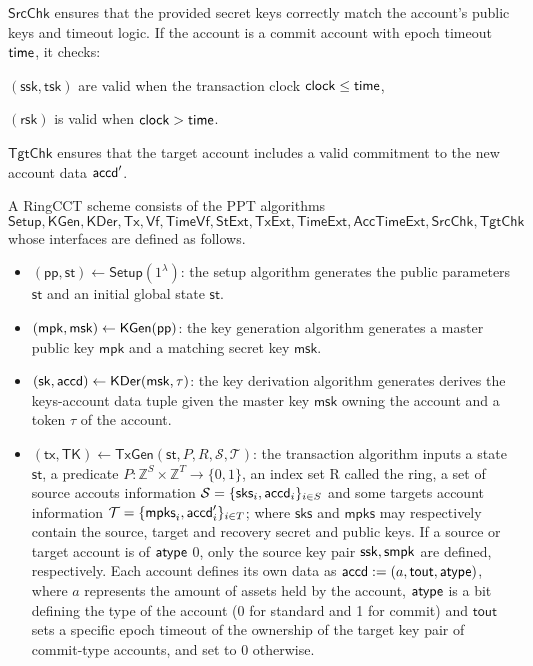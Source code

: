 $\mathsf{SrcChk}$ ensures that the provided secret keys correctly match the account’s public keys and timeout logic. If the account is a commit account with epoch timeout $\mathsf{time}$, it checks:

$(\mathsf{ssk}, \mathsf{tsk})$ are valid when the transaction clock $\mathsf{clock} \leq \mathsf{time}$,

$(\mathsf{rsk})$ is valid when $\mathsf{clock} > \mathsf{time}$.

$\mathsf{TgtChk}$ ensures that the target account includes a valid commitment to the new account data $\mathsf{accd}'$.

	\begin{definition}
    A RingCCT scheme consists of the PPT algorithms 
    \[\mathsf{Setup},\mathsf{KGen},\mathsf{KDer}, \mathsf{Tx},\mathsf{Vf},\mathsf{TimeVf}, \mathsf{StExt},\mathsf{TxExt}, \mathsf{TimeExt}, \mathsf{AccTimeExt}, \mathsf{SrcChk},\mathsf{TgtChk}\]
    whose interfaces are defined as follows.
    \begin{itemize}
        \item $(\mathsf{pp,st}) \gets \mathsf{Setup}(1^\lambda)$: the setup algorithm generates the public parameters $\mathsf{st}$ and an initial global state $\mathsf{st}$.
        \item $(\mathsf{mpk},\mathsf{msk}) \gets \mathsf{KGen}(\mathsf{pp})$: the key generation algorithm generates a master public key $\mathsf{mpk}$ and a matching secret key $\mathsf{msk}$.
        \item $(\mathsf{sk},\mathsf{accd}) \gets \mathsf{KDer}(\mathsf{msk, \tau})$: the key derivation algorithm generates derives the keys-account data tuple given the master key $\mathsf{msk}$ owning the account and a token $\tau$ of the account.
	    \item $(\mathsf{tx,TK}) \gets \mathsf{TxGen}(\mathsf{st},P,R,\mathcal{S},\mathcal{T})$: the transaction algorithm inputs a state $\mathsf{st}$, a predicate $P: \mathbb{Z}^S \times \mathbb{Z}^T \rightarrow \{0,1\}$, an index set R called the ring, a set of source accouts information $\mathcal{S} = \{\mathsf{sks}_i, \mathsf{accd}_i\}_{i\in S}$ and some targets account information $\mathcal{T} = \{\mathsf{mpks}_i, \mathsf{accd}'_i\}_{i\in T}$; where $\mathsf{sks}$ and $\mathsf{mpks}$ may respectively contain the source, target and recovery secret and public keys. If a source or target account is of $\mathsf{atype}$ 0, only the source key pair $\mathsf{ssk}, \mathsf{smpk}$ are defined, respectively. Each account defines its own data as $\mathsf{accd} := (a, \mathsf{tout}, \mathsf{atype})$, where $a$ represents the amount of assets held by the account, $\mathsf{atype}$ is a bit defining the type of the account (0 for standard and 1 for commit) and $\mathsf{tout}$ sets a specific epoch timeout of the ownership of the target key pair of commit-type accounts, and set to 0 otherwise. 

\end{itemize}
\end{definition}
